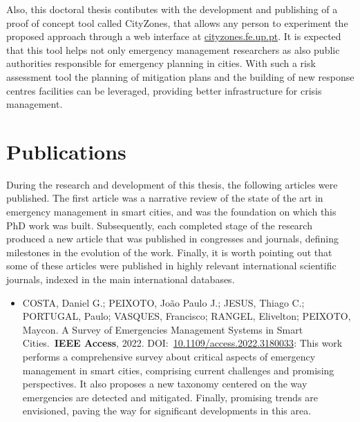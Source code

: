 \begin{refsection}
Also, this doctoral thesis contibutes with the development and publishing of a proof of concept tool called CityZones, that allows any person to experiment the proposed approach through a web interface at \hyperref{https://cityzones.fe.up.pt}{}{}{cityzones.fe.up.pt}. It is expected that this tool helps not only emergency management researchers as also public authorities responsible for emergency planning in cities. With such a risk assessment tool the planning of mitigation plans and the building of new response centres facilities can be leveraged, providing better infrastructure for crisis management.

\section{Publications}\label{sec:publicacoes}


During the research and development of this thesis, the following articles were published. The first article was a narrative review of the state of the art in emergency management in smart cities, and was the foundation on which this PhD work was built. Subsequently, each completed stage of the research produced a new article that was published in congresses and journals, defining milestones in the evolution of the work. Finally, it is worth pointing out that some of these articles were published in highly relevant international scientific journals, indexed in the main international databases.

\begin{itemize}
  \item \uppercase{Costa}, Daniel G.; \uppercase{Peixoto}, João Paulo J.; \uppercase{Jesus}, Thiago C.; \uppercase{Portugal}, Paulo; \uppercase{Vasques}, Francisco; RANGEL, Elivelton; \uppercase{Peixoto}, Maycon. A Survey of Emergencies Management Systems in Smart Cities.\ \textbf{IEEE Access}, 2022. DOI:\ \hyperref{https://doi.org/10.1109/access.2022.3180033}{}{}{10.1109/access.2022.3180033}: This work performs a comprehensive survey about critical aspects of emergency management in smart cities, comprising current challenges and promising perspectives. It also proposes a new taxonomy centered on the way emergencies are detected and mitigated. Finally, promising trends are envisioned, paving the way for significant developments in this area.


\end{itemize}
\end{refsection}
